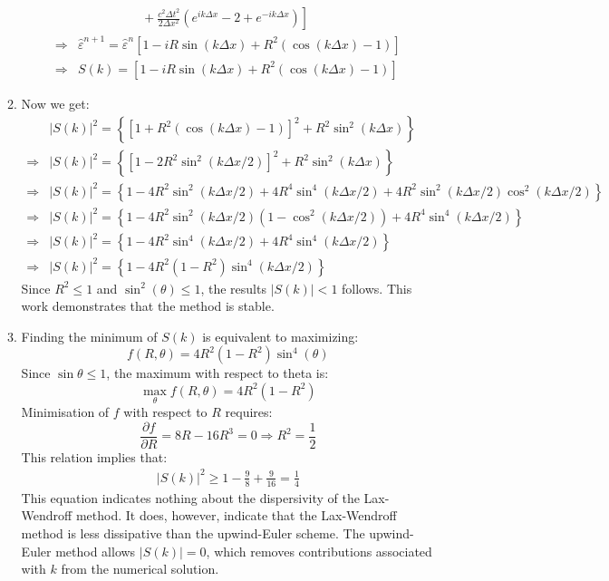 \documentclass[12pt,a4]{article}
\begin{document}
\begin{enumerate}
\begin{enumerate}
\begin{align*}
                      & \qquad \qquad \quad + \left.\frac{c^2 \Delta t^2}{2 \Delta x^2}(e^{ik\Delta x} - 2  + e^{-ik\Delta x}) \right]\\
          \Rightarrow & \hat \varepsilon^{n + 1} = \hat \varepsilon^n\left[1  - i R \sin (k \Delta x) + R^2 (\cos (k\Delta x) - 1 ) \right]\\
          \Rightarrow & S(k) = \left[1  - iR \sin (k \Delta x) + R^2 (\cos (k\Delta x) - 1 ) \right]
        \end{align*}
      \item
        Now we get:
        \begin{align*}
                      & |S(k)|^2 = \left\{\left[1 + R^2 (\cos (k\Delta x) - 1 )\right]^2 + R^2 \sin^2 (k \Delta x)  \right\}\\
          \Rightarrow & |S(k)|^2 = \left\{\left[1 - 2 R^2 \sin^2(k \Delta x / 2)\right]^2 + R^2 \sin^2 (k \Delta x)  \right\}\\
          \Rightarrow & |S(k)|^2 = \left\{1  - 4 R^2 \sin^2 (k \Delta x / 2) + 4 R^4 \sin^4 (k \Delta x / 2)+ 4R^2 \sin^2(k \Delta x / 2)\cos^2(k \Delta x / 2) \right\} \\
          \Rightarrow & |S(k)|^2 = \left\{1  - 4 R^2 \sin^2 (k \Delta x / 2)(1 - \cos^2(k \Delta x / 2)) + 4 R^4 \sin^4 (k \Delta x / 2) \right\} \\
          \Rightarrow & |S(k)|^2 = \left\{1  - 4 R^2 \sin^4 (k \Delta x / 2) + 4 R^4 \sin^4 (k \Delta x / 2) \right\} \\
          \Rightarrow & |S(k)|^2 = \left\{1  - 4 R^2 (1 - R^2) \sin^4 (k \Delta x / 2) \right\} 
        \end{align*}
        Since $R^2 \leq 1$  and $\sin^2(\theta) \leq 1$, the results $|S(k)| < 1$ follows. 
        This work demonstrates that the method is stable.
      \item
        Finding the minimum of $S(k)$ is equivalent to maximizing:
        \begin{equation*}
          f(R, \theta) = 4 R^2 (1 - R^2) \sin^4 (\theta)
        \end{equation*}
        Since $\sin \theta \leq 1$, the maximum with respect to theta is:
        \begin{equation*}
          \max_\theta f(R, \theta) = 4 R^2 (1 - R^2)
        \end{equation*}
        Minimisation of $f$ with respect to $R$ requires:
        \begin{equation*}
          \frac{\partial f}{\partial R} = 8 R - 16 R^3 = 0 \Rightarrow R^2 = \frac{1}{2}
        \end{equation*}
        This relation implies that:
        \begin{align*}
          |S(k)|^2 \geq 1 - \frac{9}{8} + \frac{9}{16} = \frac{1}{4}
        \end{align*}
        This equation indicates nothing about the dispersivity of the Lax-Wendroff method.
        It does, however, indicate that the Lax-Wendroff method is less dissipative than the upwind-Euler scheme.
        The upwind-Euler method allows $|S(k)| = 0$, which removes contributions associated with $k$ from the numerical solution.
        

\end{enumerate}
\end{enumerate}
\end{document}
